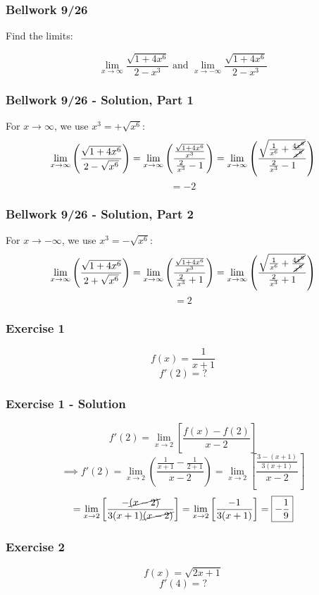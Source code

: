 \documentclass[12pt]{beamer}
\begin{document}
\begin{frame}
	\frametitle{Bellwork 9/26}
	\initclock

	\vfill
	\vfill
	\Large
	Find the limits:\par
	\[\displaystyle\lim_{x\to \infty}\frac{\sqrt{1+4x^6}}{2-x^3}\text{ and }\displaystyle\lim_{x\to -\infty}\frac{\sqrt{1+4x^6}}{2-x^3}\]
	\vfill
	\vfill
	\vfill

	\small
	\crono
\end{frame}
\begin{frame}
	\frametitle{Bellwork 9/26 - Solution, Part 1}

	For $x\to \infty$, we use $x^3 = +\sqrt{x^6}$:
	\[\displaystyle\lim_{x\to \infty}\left(\frac{\sqrt{1+4x^6}}{2-\sqrt{x^6}}\right)=\displaystyle\lim_{x\to \infty}\left(\frac{\frac{\sqrt{1+4x^6}}{x^3}}{\frac{2}{x^3}-1}\right)=\displaystyle\lim_{x\to \infty}\left(\frac{\sqrt{\frac{1}{x^6}+\frac{4\cancel{x^6}}{\cancel{x^6}}}}{\frac{2}{x^3}-1}\right)\]
	\[=\boxed{-2}\]
\end{frame}
\begin{frame}
	\frametitle{Bellwork 9/26 - Solution, Part 2}

	For $x\to -\infty$, we use $x^3 = -\sqrt{x^6}$:
	\[\displaystyle\lim_{x\to \infty}\left(\frac{\sqrt{1+4x^6}}{2+\sqrt{x^6}}\right)=\displaystyle\lim_{x\to \infty}\left(\frac{\frac{\sqrt{1+4x^6}}{x^3}}{\frac{2}{x^3}+1}\right)=\displaystyle\lim_{x\to \infty}\left(\frac{\sqrt{\frac{1}{x^6}+\frac{4\cancel{x^6}}{\cancel{x^6}}}}{\frac{2}{x^3}+1}\right)\]
	\[=\boxed{2}\]
\end{frame}
\begin{frame}
	\frametitle{Exercise 1}

	\vfill
	\LARGE
	\[f(x) = \frac{1}{x+1}\]
	\vfill
	\Large
	\[f'(2)=\text{?}\]
	\vfill
	\vfill
\end{frame}
\begin{frame}
	\frametitle{Exercise 1 - Solution}

	\large %
	\[f'(2)=\displaystyle\lim_{x\to2}\left[\frac{f(x)-f(2)}{x-2}\right]\]
	\[\implies f'(2)=\displaystyle\lim_{x\to2}\left(\frac{\frac{1}{x+1}-\frac{1}{2+1}}{x-2}\right)=\displaystyle\lim_{x\to2}\left[\frac{\frac{3-(x+1)}{3(x+1)}}{x-2}\right]\]
	\[=\displaystyle\lim_{x\to2}\left[\frac{-\cancel{(x-2)}}{3(x+1)\cancel{(x-2)}}\right]=\displaystyle\lim_{x\to2}\left[\frac{-1}{3(x+1)}\right]=\boxed{-\frac{1}{9}}\]
\end{frame}
\begin{frame}
	\frametitle{Exercise 2}

	\vfill
	\LARGE
	\[f(x) = \sqrt{2x+1}\]
	\vfill
	\Large
	\[f'(4)=\text{?}\]
	\vfill
	\vfill
\end{frame}
\end{document}
